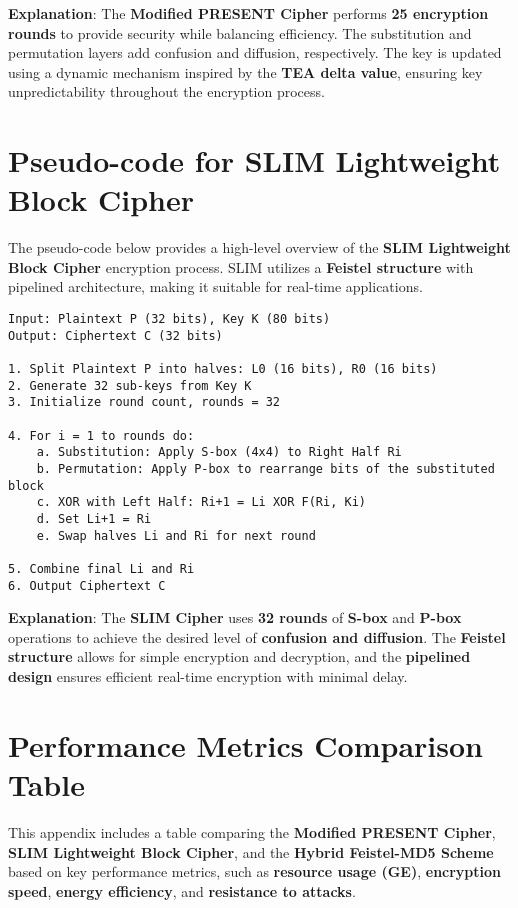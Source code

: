\documentclass{article}
\begin{document}
\noindent\textbf{Explanation}: The \textbf{Modified PRESENT Cipher} performs \textbf{25 encryption rounds} to provide security while balancing efficiency. The substitution and permutation layers add confusion and diffusion, respectively. The key is updated using a dynamic mechanism inspired by the \textbf{TEA delta value}, ensuring key unpredictability throughout the encryption process.

\section{Pseudo-code for SLIM Lightweight Block Cipher}

The pseudo-code below provides a high-level overview of the \textbf{SLIM Lightweight Block Cipher} encryption process. SLIM utilizes a \textbf{Feistel structure} with pipelined architecture, making it suitable for real-time applications.

\begin{verbatim}
Input: Plaintext P (32 bits), Key K (80 bits)
Output: Ciphertext C (32 bits)

1. Split Plaintext P into halves: L0 (16 bits), R0 (16 bits)
2. Generate 32 sub-keys from Key K
3. Initialize round count, rounds = 32

4. For i = 1 to rounds do:
    a. Substitution: Apply S-box (4x4) to Right Half Ri
    b. Permutation: Apply P-box to rearrange bits of the substituted block
    c. XOR with Left Half: Ri+1 = Li XOR F(Ri, Ki)
    d. Set Li+1 = Ri
    e. Swap halves Li and Ri for next round

5. Combine final Li and Ri
6. Output Ciphertext C
\end{verbatim}

\noindent\textbf{Explanation}: The \textbf{SLIM Cipher} uses \textbf{32 rounds} of \textbf{S-box} and \textbf{P-box} operations to achieve the desired level of \textbf{confusion and diffusion}. The \textbf{Feistel structure} allows for simple encryption and decryption, and the \textbf{pipelined design} ensures efficient real-time encryption with minimal delay.

\section{Performance Metrics Comparison Table}

This appendix includes a table comparing the \textbf{Modified PRESENT Cipher}, \textbf{SLIM Lightweight Block Cipher}, and the \textbf{Hybrid Feistel-MD5 Scheme} based on key performance metrics, such as \textbf{resource usage (GE)}, \textbf{encryption speed}, \textbf{energy efficiency}, and \textbf{resistance to attacks}.
\end{document}

